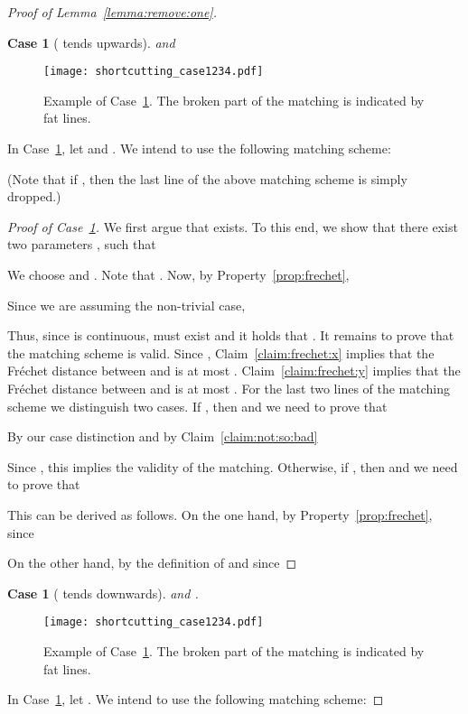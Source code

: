 \documentclass[11pt, letter]{article}
\newtheorem{case}[]{Case}
\newcommand{\lemref}[1]{Lemma~\ref{lemma:#1}}
\newcommand{\figlab}[1]{\label{fig:#1}}
\newcommand{\caselab}[1]{\label{case:#1}}
\newcommand{\caseref}[1]{Case~\ref{case:#1}}
\newcommand{\claimref}[1]{Claim~\ref{claim:#1}}
\newcommand{\propref}[1]{Property~\ref{prop:#1}}
\newcommand{\Frechet}{Fr\'echet\xspace}
\begin{document}
\begin{proof}[Proof of \lemref{remove:one}]
\begin{case}[ tends upwards]
 and 
\caselab{upwards}
\end{case}
\begin{figure}[h]\centering
\texttt{[image: shortcutting\_case1234.pdf]}\\
\caption{Example of \caseref{upwards}. The broken part of the matching  is indicated by fat lines.}
\figlab{shortcutting:case3}
\end{figure}
 In \caseref{upwards}, let  and . We intend to use
 the following matching scheme:

(Note that if , then the last line of the above matching scheme is simply dropped.) 

\begin{proof}[Proof of \caseref{upwards}]
We first argue that  exists. To this end, we show that there exist
two parameters , such that

We choose  and .
Note that .
Now, by \propref{frechet},
 
Since we are assuming the non-trivial case, 
 
Thus, since  is continuous,  must exist and it holds that .
It remains to prove that the matching scheme is valid.
Since ,
\claimref{frechet:x} implies that the \Frechet distance between 
and  is at most .
\claimref{frechet:y} implies that the \Frechet distance between 
and  is at most .
For the last two lines of the matching scheme we distinguish two cases.
If , then  and we need to prove that

By our case distinction and by \claimref{not:so:bad}

Since , this implies the validity of the matching.
Otherwise, if , then  and we need to prove 
that 

This can be derived as follows. On the one hand, by \propref{frechet}, since 

On the other hand, by the definition of  and since 

\end{proof}

\begin{case}[ tends downwards]
 and .
\caselab{downwards}
\end{case}
\begin{figure}[h]\centering
\texttt{[image: shortcutting\_case1234.pdf]}\\
\caption{Example of \caseref{downwards}. The broken part of the matching  is indicated by fat lines.}
\figlab{shortcutting:case4}
\end{figure}
In \caseref{downwards}, let . 
We intend to use the following matching scheme:



\end{proof}
\end{document}
